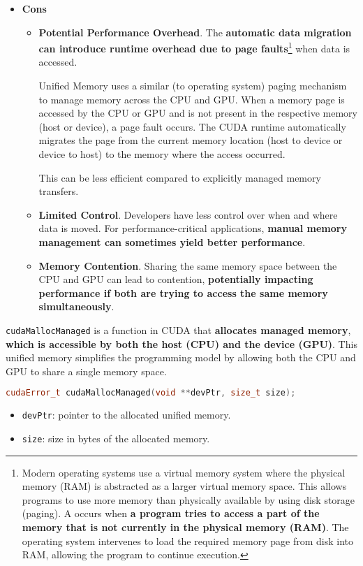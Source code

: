 \begin{itemize}
    \item[\textcolor{Red2}{\faIcon{times}}] \textcolor{Red2}{\textbf{Cons}}
    \begin{itemize}
        \item[\textcolor{Red2}{\faIcon{times}}] \textcolor{Red2}{\textbf{Potential Performance Overhead}}. The \textbf{automatic data migration can introduce runtime overhead due to page faults}\footnote{
            Modern operating systems use a virtual memory system where the physical memory (RAM) is abstracted as a larger virtual memory space. This allows programs to use more memory than physically available by using disk storage (paging). A  occurs when \textbf{a program tries to access a part of the memory that is not currently in the physical memory (RAM)}. The operating system intervenes to load the required memory page from disk into RAM, allowing the program to continue execution.
        } when data is accessed. 
        
        Unified Memory uses a similar (to operating system) paging mechanism to manage memory across the CPU and GPU. When a memory page is accessed by the CPU or GPU and is not present in the respective memory (host or device), a page fault occurs. The CUDA runtime automatically migrates the page from the current memory location (host to device or device to host) to the memory where the access occurred.

        This can be less efficient compared to explicitly managed memory transfers.
        
        \item[\textcolor{Red2}{\faIcon{times}}] \textcolor{Red2}{\textbf{Limited Control}}. Developers have less control over when and where data is moved. For performance-critical applications, \textbf{manual memory management can sometimes yield better performance}.
        
        \item[\textcolor{Red2}{\faIcon{times}}] \textcolor{Red2}{\textbf{Memory Contention}}. Sharing the same memory space between the CPU and GPU can lead to contention, \textbf{potentially impacting performance if both are trying to access the same memory simultaneously}.
    \end{itemize}
\end{itemize}

\newpage

\noindent
\texttt{cudaMallocManaged} is a function in CUDA that \textbf{allocates managed memory}, \textbf{which is accessible by both the host (CPU) and the device (GPU)}. This unified memory simplifies the programming model by allowing both the CPU and GPU to share a single memory space.
\begin{lstlisting}[language=C++]
cudaError_t cudaMallocManaged(void **devPtr, size_t size);  
\end{lstlisting}
\begin{itemize}
    \item \texttt{devPtr}: pointer to the allocated unified memory.
    \item \texttt{size}: size in bytes of the allocated memory.
\end{itemize}

